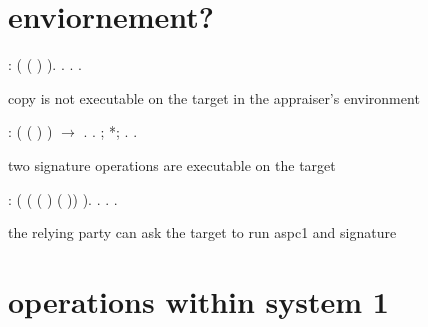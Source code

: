 \documentclass[12pt]{report}
\begin{document}
\section{enviornement?}


 
\begin{coqdoccode}
\coqdocemptyline
\coqdocnoindent
{} : ( ( )  ).\coqdoceol
\coqdocnoindent
{}. . .\coqdoceol
\coqdocemptyline
\end{coqdoccode}
copy is not executable on the target in the appraiser's environment
 
\begin{coqdoccode}
\coqdocemptyline
\coqdocnoindent
{} : ( ( )  ) \ensuremath{\rightarrow} .\coqdoceol
\coqdocnoindent
{}.\coqdoceol
\coqdocindent{1.00em}
 ;   *;  .\coqdoceol
\coqdocnoindent
{}.\coqdoceol
\coqdocemptyline
\end{coqdoccode}
two signature operations are executable on the target
 
\begin{coqdoccode}
\coqdocemptyline
\coqdocnoindent
{} : ( ( ( ) ( ))  ).\coqdoceol
\coqdocnoindent
{}. . .\coqdoceol
\coqdocemptyline
\end{coqdoccode}
the relying party can ask the target to run aspc1 and signature
\section{operations within system 1}
\end{document}
